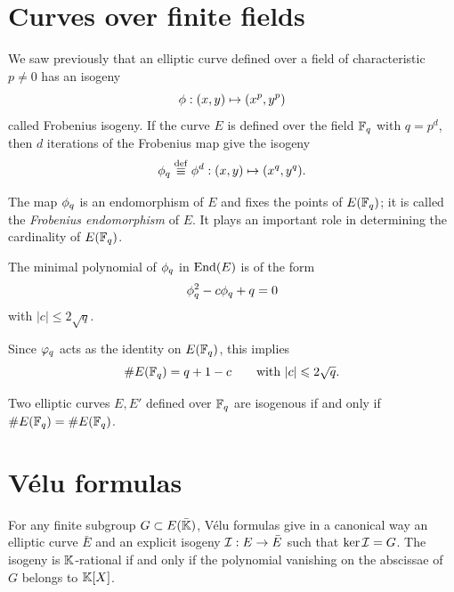 \section{Curves over finite fields}
\label{sec:curves-over-finite}
We saw previously that an elliptic curve defined over a field of
characteristic $p\ne0$ has an isogeny
\begin{equation}
  \label{eq:150}
  \phi:(x,y)\mapsto(x^p,y^p)
\end{equation}
called Frobenius isogeny. If the curve $E$ is defined over the field
$\mathbb{F}_q$ with $q=p^d$, then $d$ iterations of the Frobenius map give the
isogeny
\begin{equation}
  \label{eq:151}
  \phi_q\overset{\mathrm{def}}{\equiv}\phi^d:(x,y)\mapsto(x^q,y^q)
  \text{.}
\end{equation}

The map $\phi_q$ is an endomorphism of $E$ and fixes the points
of $E(\mathbb{F}_q)$; it is called the \emph{Frobenius endomorphism} of $E$. It plays an
important role in determining the cardinality of $E(\mathbb{F}_q)$.

\begin{theorem}[Hasse]
  The minimal polynomial of $\phi_q$ in $\operatorname{End}(E)$ is of the form
  \begin{equation}
    \label{eq:152}
    \phi_q^2 - c\phi_q + q = 0
  \end{equation}
  with $\lvert c\rvert\le2\sqrt{q}$.
\end{theorem}

Since $\varphi_q$ acts as the identity on $E(\mathbb{F}_q)$, this implies
\begin{equation}
  \label{eq:153}
  \# E(\mathbb{F}_q) = q+1-c
  \qquad\text{with } \lvert c\rvert\leqslant2\sqrt{q}
  \text{.}
\end{equation}

\begin{theorem}
  Two elliptic curves $E,E'$ defined over $\mathbb{F}_q$ are isogenous if and
  only if $\# E(\mathbb{F}_q)=\# E(\mathbb{F}_q)$.
\end{theorem}


\section{Vélu formulas}
\label{sec:velu-formulas}
For any finite subgroup $G \subset E(\bar{\mathbb{K}})$, Vélu formulas
\cite{Vel71} give in a canonical way an elliptic curve $\bar{E}$ and
an explicit isogeny $\mathcal{I}:E\rightarrow \bar{E}$ such that
$\ker\mathcal{I}=G$. The isogeny is $\mathbb{K}$-rational if and only if the polynomial
vanishing on the abscissae of $G$ belongs to $\mathbb{K}[X]$.


